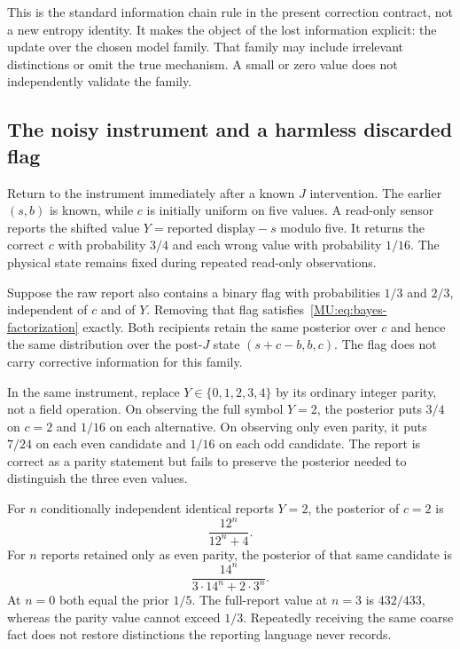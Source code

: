 This is the standard information chain rule in the present correction contract, not a new entropy identity. It makes the object of the lost information explicit: the update over the chosen model family. That family may include irrelevant distinctions or omit the true mechanism. A small or zero value does not independently validate the family.

\subsection{The noisy instrument and a harmless discarded flag}
Return to the instrument immediately after a known $J$ intervention. The earlier $(s,b)$ is known, while $c$ is initially uniform on five values. A read-only sensor reports the shifted value $Y=\text{reported display}-s$ modulo five. It returns the correct $c$ with probability $3/4$ and each wrong value with probability $1/16$. The physical state remains fixed during repeated read-only observations.

Suppose the raw report also contains a binary flag with probabilities $1/3$ and $2/3$, independent of $c$ and of $Y$. Removing that flag satisfies~\eqref{MU:eq:bayes-factorization} exactly. Both recipients retain the same posterior over $c$ and hence the same distribution over the post-$J$ state $(s+c-b,b,c)$. The flag does not carry corrective information for this family.

\begin{MUcounterexample}\label{MU:ex:noisy-parity}
In the same instrument, replace $Y\in\{0,1,2,3,4\}$ by its ordinary integer parity, not a field operation. On observing the full symbol $Y=2$, the posterior puts $3/4$ on $c=2$ and $1/16$ on each alternative. On observing only even parity, it puts $7/24$ on each even candidate and $1/16$ on each odd candidate. The report is correct as a parity statement but fails to preserve the posterior needed to distinguish the three even values.
\end{MUcounterexample}

For $n$ conditionally independent identical reports $Y=2$, the posterior of $c=2$ is
\[
\frac{12^n}{12^n+4}.
\]
For $n$ reports retained only as even parity, the posterior of that same candidate is
\[
\frac{14^n}{3\cdot14^n+2\cdot3^n}.
\]
At $n=0$ both equal the prior $1/5$. The full-report value at $n=3$ is $432/433$, whereas the parity value cannot exceed $1/3$. Repeatedly receiving the same coarse fact does not restore distinctions the reporting language never records.

